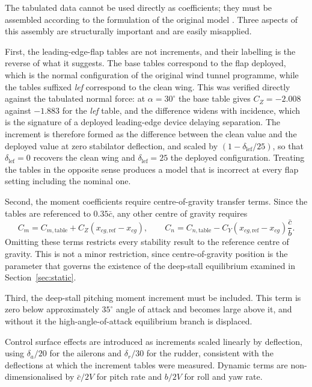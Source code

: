 \documentclass[
bindingoffset=5mm,  %
footnoteindent=3mm, %
hyphenation=true    %
]{src/wut-thesis}
\begin{document}
 The tabulated data cannot be used directly as coefficients; they must be
 assembled according to the formulation of the original model
 \cite{sonneveldt2006}. Three aspects of this assembly are structurally
 important and are easily misapplied.
 
 
 First, the leading-edge-flap tables are not increments, and their labelling
 is the reverse of what it suggests. The base tables correspond to the flap
 deployed, which is the normal configuration of the original wind tunnel
 programme, while the tables suffixed \emph{lef} correspond to the clean wing.
 This was verified directly against the tabulated normal force: at
 $\alpha = 30^{\circ}$ the base table gives $C_{Z} = -2.008$ against $-1.883$
 for the \emph{lef} table, and the difference widens with incidence, which is
 the signature of a deployed leading-edge device delaying separation. The
 increment is therefore formed as the difference between the clean value and
 the deployed value at zero stabilator deflection, and scaled by
 $(1 - \delta_{\mathrm{lef}}/25)$, so that $\delta_{\mathrm{lef}} = 0$ recovers
 the clean wing and $\delta_{\mathrm{lef}} = 25$ the deployed configuration.
 Treating the tables in the opposite sense produces a model that is incorrect
 at every flap setting including the nominal one.
 
 
 Second, the moment coefficients require centre-of-gravity transfer terms.
 Since the tables are referenced to $0.35\bar{c}$, any other centre of gravity
 requires
 \begin{equation}
 	C_{m} = C_{m,\mathrm{table}} + C_{Z}\left(x_{cg,\mathrm{ref}} - x_{cg}\right),
 	\qquad
 	C_{n} = C_{n,\mathrm{table}} - C_{Y}\left(x_{cg,\mathrm{ref}} - x_{cg}\right)\frac{\bar{c}}{b}.
 	\label{eq:cgtransfer}
 \end{equation}
 Omitting these terms restricts every stability result to the reference centre
 of gravity. This is not a minor restriction, since centre-of-gravity position
 is the parameter that governs the existence of the deep-stall equilibrium
 examined in Section~\ref{sec:static}.
 
 Third, the deep-stall pitching moment increment must be included. This term
 is zero below approximately $35^{\circ}$ angle of attack and becomes large
 above it, and without it the high-angle-of-attack equilibrium branch is
 displaced.
 
 Control surface effects are introduced as increments scaled linearly by
 deflection, using $\delta_{a}/20$ for the ailerons and $\delta_{r}/30$ for
 the rudder, consistent with the deflections at which the increment tables
 were measured. Dynamic terms are non-dimensionalised by $\bar{c}/2V$ for pitch
 rate and $b/2V$ for roll and yaw rate.
 
\end{document}
